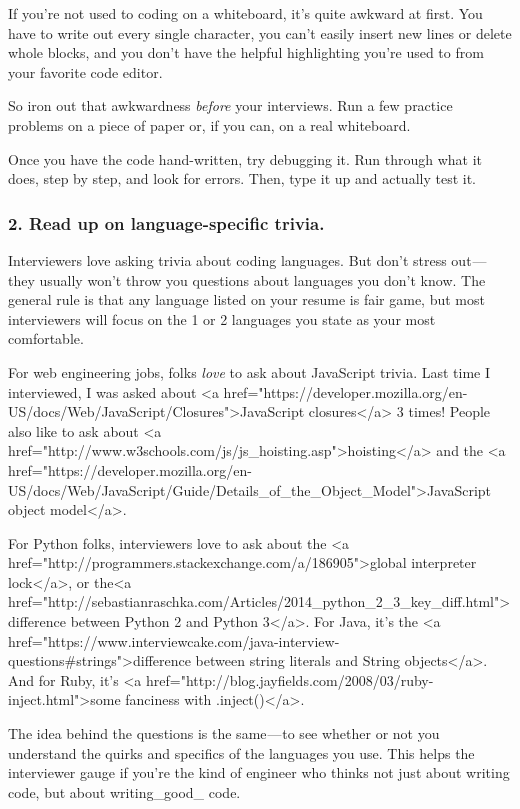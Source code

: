 \documentclass[a4paper,12pt]{article}
\begin{document}
If you’re not used to coding on a whiteboard, it’s quite awkward at first. You
have to write out every single character, you can’t easily insert new lines or
delete whole blocks, and you don’t have the helpful highlighting you’re used
to from your favorite code editor.

So iron out that awkwardness \emph{before} your interviews. Run a few practice
problems on a piece of paper or, if you can, on a real whiteboard.

Once you have the code hand-written, try debugging it. Run through what it
does, step by step, and look for errors. Then, type it up and actually test
it.

\subsubsection*{2. Read up on language-specific trivia.}

Interviewers love asking trivia about coding languages. But don’t stress out —
they usually won’t throw you questions about languages you don’t know. The
general rule is that any language listed on your resume is fair game, but most
interviewers will focus on the 1 or 2 languages you state as your most
comfortable.

For web engineering jobs, folks \emph{love} to ask about JavaScript trivia. Last
time I interviewed, I was asked about <a href="https://developer.mozilla.org/en-US/docs/Web/JavaScript/Closures">JavaScript
closures</a> 3
times! People also like to ask about
<a href="http://www.w3schools.com/js/js_hoisting.asp">hoisting</a> and the <a href="https://developer.mozilla.org/en-
US/docs/Web/JavaScript/Guide/Details_of_the_Object_Model">JavaScript
object model</a>.

For Python folks, interviewers love to ask about the <a href="http://programmers.stackexchange.com/a/186905">global interpreter
lock</a>, or the<a href="http://sebastianraschka.com/Articles/2014_python_2_3_key_dif\kern0pt{}f.html">dif\kern0pt{}ference
between Python 2 and Python
3</a>. For
Java, it’s the <a href="https://www.interviewcake.com/java-interview-questions#strings">dif\kern0pt{}ference between string literals and String
objects</a>. And
for Ruby, it’s <a href="http://blog.jayfields.com/2008/03/ruby-inject.html">some fanciness with
.inject()</a>.

The idea behind the questions is the same — to see whether or not you
understand the quirks and specifics of the languages you use. This helps the
interviewer gauge if you’re the kind of engineer who thinks not just about
writing code, but about writing_good_ code.
\end{document}
